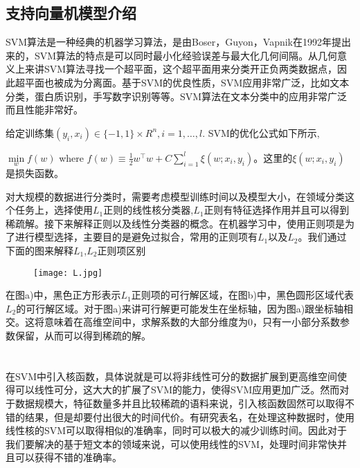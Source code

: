 \documentclass[master]{njuthesis}
\begin{document}
\subsection{支持向量机模型介绍}

    SVM算法是一种经典的机器学习算法，是由Boser，Guyon，Vapnik在1992年提出来的，SVM算法的特点是可以同时最小化经验误差与最大化几何间隔\cite{SVM}。从几何意义上来讲SVM算法寻找一个超平面，这个超平面用来分类开正负两类数据点，因此超平面也被成为分离面。基于SVM的优良性质，SVM应用非常广泛，比如文本分类，蛋白质识别，手写数字识别等等。SVM算法在文本分类中的应用非常广泛而且性能非常好。
    
    给定训练集$\left(y_i,x_i\right) \in \{-1,1\} \times R^n,i=1,\dots,l.$ SVM的优化公式如下所示,
    
    $\min\limits_{w} f\left(w\right)$ where $f\left(w\right) \equiv \frac{1}{2} w^\intercal w+C\sum_{i=1}^{l} \xi\left(w;x_i,y_i\right)$。这里的$\xi\left(w;x_i,y_i\right)$是损失函数。

    对大规模的数据进行分类时，需要考虑模型训练时间以及模型大小，在领域分类这个任务上，选择使用$L_1$正则的线性核分类器,$L_1$正则有特征选择作用并且可以得到稀疏解\cite{1normSVM}。接下来解释正则以及线性分类器的概念。在机器学习中，使用正则项是为了进行模型选择，主要目的是避免过拟合，常用的正则项有$L_1$以及$L_2$。我们通过下面的图来解释$L_1$,$L_2$正则项区别
   
    \begin{figure}[htbp]
      \centering
      \texttt{[image: L.jpg]}\\
      \caption{}\label{fig:test}
    \end{figure}
    
    在图a)中，黑色正方形表示$L_1$正则项的可行解区域，在图b)中，黑色圆形区域代表$L_2$的可行解区域。对于图a)来讲可行解更可能发生在坐标轴，因为图a)跟坐标轴相交。这将意味着在高维空间中，求解系数的大部分维度为0，只有一小部分系数参数保留，从而可以得到稀疏的解。
    \\
    \\
    \\

    在SVM中引入核函数，具体说就是可以将非线性可分的数据扩展到更高维空间使得可以线性可分，这大大的扩展了SVM的能力，使得SVM应用更加广泛\cite{kernelSVM}。然而对于数据规模大，特征数量多并且比较稀疏的语料来说，引入核函数固然可以取得不错的结果，但是却要付出很大的时间代价。有研究表名，在处理这种数据时，使用线性核的SVM可以取得相似的准确率，同时可以极大的减少训练时间。因此对于我们要解决的基于短文本的领域来说，可以使用线性的SVM，处理时间非常快并且可以获得不错的准确率。
\end{document}
